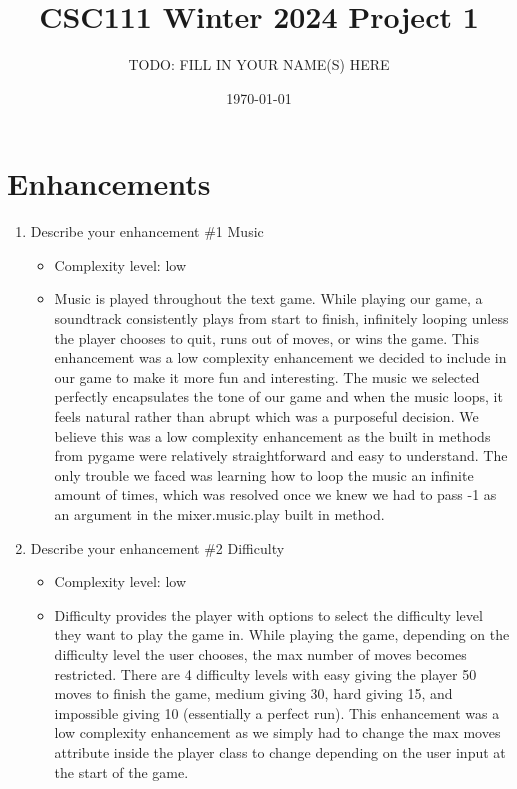 \documentclass[11pt]{article}
\title{CSC111 Winter 2024 Project 1}
\author{TODO: FILL IN YOUR NAME(S) HERE}
\date{\today}
\begin{document}
\maketitle

\section*{Enhancements}


\begin{enumerate}

\item Describe your enhancement \#1 Music
	\begin{itemize}
	\item Complexity level: low
	\item Music is played throughout the text game. While playing our game, a soundtrack consistently plays from start to finish, infinitely looping unless the player chooses to quit, runs out of moves, or wins the game. This enhancement was a low complexity enhancement we decided to include in our game to make it more fun and interesting. The music we selected perfectly encapsulates the tone of our game and when the music loops, it feels natural rather than abrupt which was a purposeful decision. We believe this was a low complexity enhancement as the built in methods from pygame were relatively straightforward and easy to understand. The only trouble we faced was learning how to loop the music an infinite amount of times, which was resolved once we knew we had to pass -1 as an argument in the mixer.music.play built in method.
	\end{itemize}

\item Describe your enhancement \#2 Difficulty
	\begin{itemize}
	\item Complexity level: low
    \item Difficulty provides the player with options to select the difficulty level they want to play the game in. While playing the game, depending on the difficulty level the user chooses, the max number of moves becomes restricted. There are 4 difficulty levels with easy giving the player 50 moves to finish the game, medium giving 30, hard giving 15, and impossible giving 10 (essentially a perfect run). This enhancement was a low complexity enhancement as we simply had to change the max moves attribute inside the player class to change depending on the user input at the start of the game.
	\end{itemize}


\end{enumerate}
\end{document}
